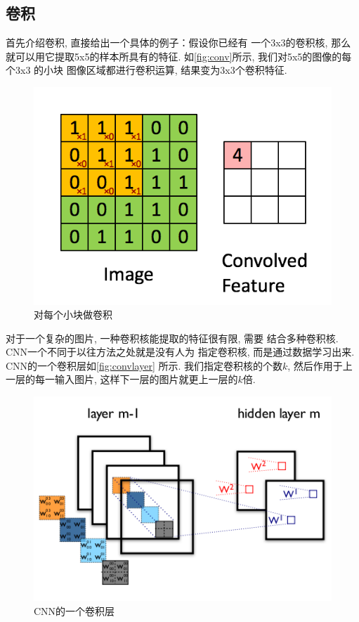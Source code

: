 \documentclass{ctexart}
\begin{document}
\subsection{卷积}

首先介绍卷积, 直接给出一个具体的例子：假设你已经有
一个3x3的卷积核, 那么就可以用它提取5x5的样本所具有的特征.
如\autoref{fig:conv}所示, 我们对5x5的图像的每个3x3 的小块
图像区域都进行卷积运算, 结果变为3x3个卷积特征.
\begin{figure}[htb]
  \centering
  \includegraphics[width=.8\textwidth]{conv}
  \caption{对每个小块做卷积}
  \label{fig:conv}
\end{figure}

对于一个复杂的图片, 一种卷积核能提取的特征很有限, 需要
结合多种卷积核. CNN一个不同于以往方法之处就是没有人为
指定卷积核, 而是通过数据学习出来. CNN的一个卷积层如\autoref{fig:convlayer}
所示. 我们指定卷积核的个数\(k\), 然后作用于上一层的每一输入图片,
这样下一层的图片就更上一层的\(k\)倍.
\begin{figure}[htb]
  \centering
  \includegraphics[width=.8\textwidth]{convlayer}
  \caption{CNN的一个卷积层}
  \label{fig:convlayer}
\end{figure}
\end{document}
